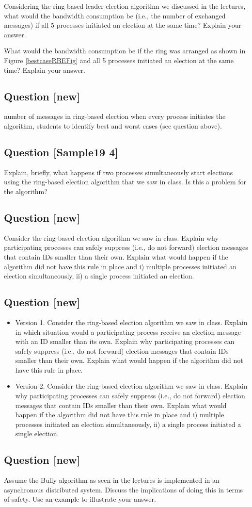 \documentclass[11pt]{article}
\newcounter{question}
\newcommand{\question}[1]{
    \stepcounter{question}
    \subsection*{Question \thequestion \hfill
      {\normalsize [{#1}]}} }
\begin{document}
Considering the ring-based leader election algorithm we discussed in the lectures, what would the bandwidth consumption be (i.e., the number of exchanged messages) if all 5  processes initiated an election at the same time? Explain your answer.

What would the bandwidth consumption be if the ring was arranged as shown in Figure \ref{bestcaseRBEFig} and all 5 processes initiated an election at the same time? Explain your answer.

\question {new}
number of messages in ring-based election when every process initiates the algorithm, students to identify best and worst cases (see question above).

\question{Sample19 4}
Explain,  briefly,  what  happens  if  two  processes  simultaneously  start  elections  using  the  ring-based election algorithm that we saw in class. Is this a problem for the algorithm? 

\question{new}
 Consider the ring-based election algorithm we saw in class. Explain why participating processes can safely suppress (i.e., do not forward) election messages that contain IDs smaller than their own. Explain what would happen if the algorithm did not have this rule in place and i) multiple processes initiated an election simultaneously, ii) a single process initiated an election.
 
 \question{new}
 \begin{itemize}
 	\item
 	Version 1. Consider the ring-based election algorithm we saw in class. Explain in which situation would a participating process receive an election message with an ID smaller than its own. Explain why participating processes can safely suppress (i.e., do not forward) election messages that contain IDs smaller than their own. Explain what would happen if the algorithm did not have this rule in place. 
 	
 	\item
 	Version 2. Consider the ring-based election algorithm we saw in class. Explain why participating processes can safely suppress (i.e., do not forward) election messages that contain IDs smaller than their own. Explain what would happen if the algorithm did not have this rule in place and i) multiple processes initiated an election simultaneously, ii) a single process initiated a single election.
 	
 \end{itemize}

\question{new}
Assume the Bully algorithm as seen in the lectures is implemented in an asynchronous distributed system. Discuss the implications of doing this in terms of safety. Use an example to illustrate your answer. 
\end{document}
